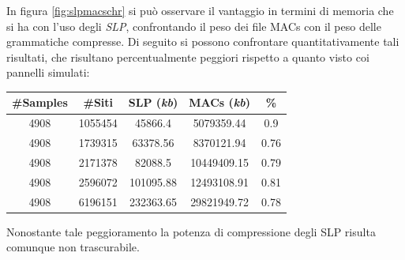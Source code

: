 In figura \ref{fig:slpmacschr} si può osservare il vantaggio in termini di
memoria che si ha con l'uso degli \textit{SLP}, confrontando il peso dei file
MACs con il peso delle grammatiche compresse. Di seguito si possono confrontare
quantitativamente tali risultati, che risultano percentualmente peggiori
rispetto a quanto visto coi pannelli simulati:
\begin{table}[H]
  \centering
  \begin{tabular}{c|c|c|c|c}
    \textbf{\#Samples} & \textbf{\#Siti} & \textbf{SLP (\textit{kb})}
    & \textbf{MACs (\textit{kb})} & \textbf{\%}\\
    \hline
    4908 & 1055454 & 45866.4 & 5079359.44 & 0.9\\
    4908 & 1739315 & 63378.56 & 8370121.94 & 0.76\\
    4908 & 2171378 & 82088.5 & 10449409.15 & 0.79\\
    4908 & 2596072 & 101095.88 & 12493108.91 & 0.81\\
    4908 & 6196151 & 232363.65 & 29821949.72 & 0.78\\
  \end{tabular}
\end{table}
Nonostante tale peggioramento la potenza di compressione degli \textup{SLP}
risulta comunque non trascurabile.
